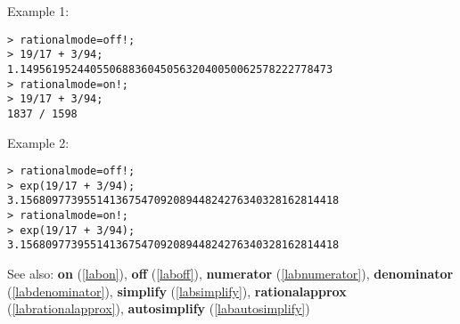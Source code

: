 \noindent Example 1: 
\begin{center}\begin{minipage}{15cm}\begin{Verbatim}[frame=single]
> rationalmode=off!;
> 19/17 + 3/94;
1.1495619524405506883604505632040050062578222778473
> rationalmode=on!;
> 19/17 + 3/94;
1837 / 1598
\end{Verbatim}
\end{minipage}\end{center}
\noindent Example 2: 
\begin{center}\begin{minipage}{15cm}\begin{Verbatim}[frame=single]
> rationalmode=off!;
> exp(19/17 + 3/94);
3.15680977395514136754709208944824276340328162814418
> rationalmode=on!;
> exp(19/17 + 3/94);
3.15680977395514136754709208944824276340328162814418
\end{Verbatim}
\end{minipage}\end{center}
See also: \textbf{on} (\ref{labon}), \textbf{off} (\ref{laboff}), \textbf{numerator} (\ref{labnumerator}), \textbf{denominator} (\ref{labdenominator}), \textbf{simplify} (\ref{labsimplify}), \textbf{rationalapprox} (\ref{labrationalapprox}), \textbf{autosimplify} (\ref{labautosimplify})
